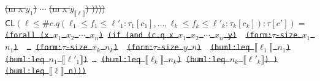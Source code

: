\documentclass[10pt,fleqn,final]{scrreprt}
\newcommand*{\CL}{\ensuremath{\mathsf{CL}}\xspace}
\newenvironment{definitions}[0]{\medskip }{}
\newcommand{\sem}[1]{\mathopen\llbracket#1\mathclose\rrbracket}
\newcommand{\white}[1]{{\color{white}{#1}}}
\newcommand{\qqquad}{\white{x}\qquad}
\providecommand{\DIFdel}[1]{{\protect\color{red}\sout{#1}}}                      %
\providecommand{\DIFaddbegin}{} %
\providecommand{\DIFdelend}{} %
\begin{document}
\begin{definitions}
{%
\DIFdel{(m x  $y_1$)}%
\DIFdel{$\cdots$}%
\DIFdel{(m x $y_{\sem{\ell}}$) ))))}}
\DIFdel{$\CL(\ell \leq \mathsf{\#}c.q(\ell_1 \leq f_1 \leq \ell'_1: \tau_1[c_1], \ldots, \ell_k\leq f_k \leq \ell'_k: \tau_k[c_k]) : \tau[c'])=$}%
\texttt{\DIFdel{(forall (x $x_1$ $x_2$ $\cdots$  $x_n$)}%
\DIFdel{(if (and (c.q x $x_1$ $x_2$ $\cdots$  $x_n$ y) }%
\DIFdel{(form:$\tau$-size $x_1$ $n_1$) }%
\DIFdel{\ldots}%
\DIFdel{(form:$\tau$-size $x_k$ $n_k$) }%
\DIFdel{(form:$\tau$-size $y$ $n$) }%
\DIFdel{(buml:leq $\sem{\ell_1}$ $n_1$)}%
\DIFdel{(buml:leq $n_1$ $\sem{\ell'_1}$)}%
\DIFdel{\ldots}%
\DIFdel{(buml:leq $\sem{\ell_k}$ $n_k$)}%
\DIFdel{(buml:leq $n_k$ $\sem{\ell'_k}$) )}%
\DIFdel{(buml:leq $\sem{\ell}$ n)))}}
\DIFdelend %
\DIFaddbegin \begin{lstlisting}[language=clif, mathescape]

\end{lstlisting}
\end{definitions}
\end{document}
